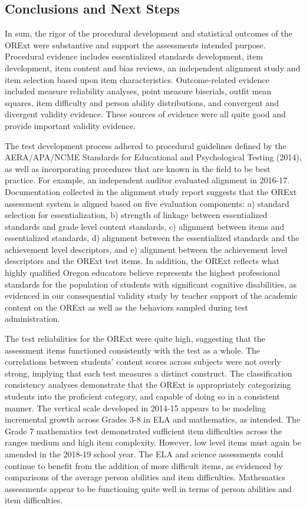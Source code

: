 \documentclass[]{article}
\begin{document}
\hypertarget{conclusions-and-next-steps}{%
\subsection{Conclusions and Next
Steps}\label{conclusions-and-next-steps}}

In sum, the rigor of the procedural development and statistical outcomes
of the ORExt were substantive and support the assessments intended
purpose. Procedural evidence includes essentialized standards
development, item development, item content and bias reviews, an
independent alignment study and item selection based upon item
characteristics. Outcome-related evidence included measure reliability
analyses, point measure biserials, outfit mean squares, item difficulty
and person ability distributions, and convergent and divergent validity
evidence. These sources of evidence were all quite good and provide
important validity evidence.

The test development process adhered to procedural guidelines defined by
the AERA/APA/NCME Standards for Educational and Psychological Testing
(2014), as well as incorporating procedures that are known in the field
to be best practice. For example, an independent auditor evaluated
alignment in 2016-17. Documentation collected in the alignment study
report suggests that the ORExt assessment system is aligned based on
five evaluation components: a) standard selection for essentialization,
b) strength of linkage between essentialized standards and grade level
content standards, c) alignment between items and essentialized
standards, d) alignment between the essentialized standards and the
achievement level descriptors, and e) alignment between the achievement
level descriptors and the ORExt test items. In addition, the ORExt
reflects what highly qualified Oregon educators believe represents the
highest professional standards for the population of students with
significant cognitive disabilities, as evidenced in our consequential
validity study by teacher support of the academic content on the ORExt
as well as the behaviors sampled during test administration.

The test reliabilities for the ORExt were quite high, suggesting that
the assessment items functioned consistently with the test as a whole.
The correlations between students' content scores across subjects were
not overly strong, implying that each test measures a distinct
construct. The classification consistency analyses demonstrate that the
ORExt is appropriately categorizing students into the proficient
category, and capable of doing so in a consistent manner. The vertical
scale developed in 2014-15 appears to be modeling incremental growth
across Grades 3-8 in ELA and mathematics, as intended. The Grade 7
mathematics test demonstrated sufficient item difficulties across the
ranges medium and high item complexity. However, low level items must
again be amended in the 2018-19 school year. The ELA and science
assessments could continue to benefit from the addition of more
difficult items, as evidenced by comparisons of the average person
abilities and item difficulties. Mathematics assessments appear to be
functioning quite well in terms of person abilities and item
difficulties.
\end{document}
